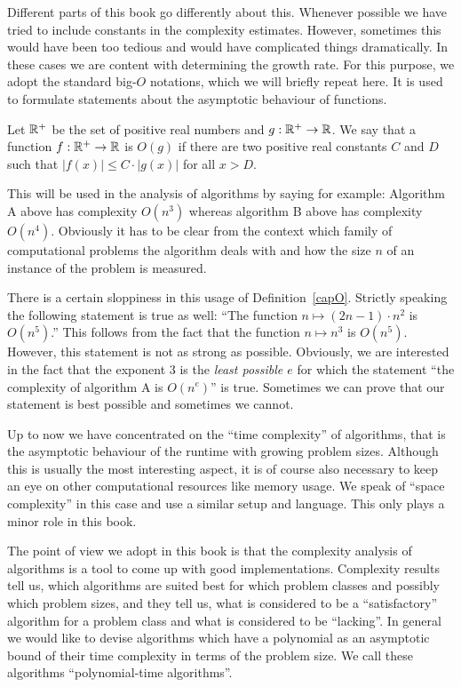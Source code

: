 Different parts of this book go differently about this. Whenever
possible we have tried to include constants in the complexity
estimates. However, sometimes this would have been too tedious and
would have complicated things dramatically. In these cases we are
content with determining the growth rate. For this purpose, we adopt
the standard big-$O$ notations, which we will briefly repeat here.
It is used to formulate statements about the asymptotic behaviour of
functions.

\begin{Def}
    \label{capO}
    Let $\mathbb{R}^+$ be the set of positive real numbers and
    $g : \mathbb{R}^+ \to \mathbb{R}$.
    We say that a function $f : \mathbb{R}^+ \to \mathbb{R}$ is $O(g)$ if there are
    two positive real constants $C$ and $D$ such that 
    $|f(x)| \le C \cdot |g(x)|$ for all $x > D$.
\end{Def}

This will be used in the analysis of algorithms by saying for
example: Algorithm A above has complexity $O(n^3)$ whereas algorithm B
above has complexity $O(n^4)$. Obviously it has to be clear from the
context which family of computational problems the algorithm deals
with and how the size $n$ of an instance of the problem is measured.

There is a certain sloppiness in this usage of Definition~\ref{capO}.
Strictly speaking the following statement is true as well: 
``The function $n \mapsto (2n-1)\cdot n^2$ is $O(n^5)$.'' This follows
from the fact that the function $n \mapsto n^3$ is $O(n^5)$. However,
this statement is not as strong as possible. Obviously, we are
interested in the fact that the exponent $3$ is the \emph{least
possible $e$} for which the statement ``the complexity of algorithm A is
$O(n^e)$'' is true. Sometimes we can prove that our statement is best
possible and sometimes we cannot.

Up to now we have concentrated on the ``time complexity'' of
algorithms, that is the asymptotic behaviour of the runtime with
growing problem sizes. Although this is usually the most interesting
aspect, it is of course also necessary to keep an eye on other
computational resources like memory usage. We speak of ``space
complexity'' in this case and use a similar setup and language. This
only plays a minor role in this book.

The point of view we adopt in this book is that the complexity analysis of
algorithms is a tool to come up with good implementations. Complexity
results tell us, which algorithms are suited best for which problem
classes and possibly which problem sizes, and they tell us, what is
considered to be a ``satisfactory'' algorithm for a problem class and
what is considered to be ``lacking''. In general we would like to
devise algorithms which have a polynomial as an asymptotic bound of their
time complexity in terms of the problem size. We call these algorithms
``polynomial-time algorithms''.


